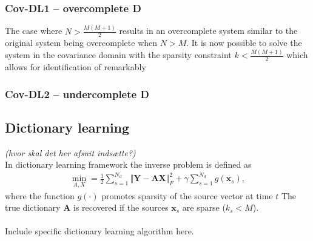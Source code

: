 \subsubsection*{Cov-DL1 -- overcomplete \textbf{D}}
The case where $N > \frac{M(M+1)}{2}$ results in an overcomplete system similar to the original system being overcomplete when $N>M$. It is now possible to solve the system in the covariance domain with the sparsity constraint $k < \frac{M(M+1)}{2}$ which allows for identification of remarkably     







  

\subsubsection*{Cov-DL2 -- undercomplete \textbf{D}}


\subsection{Dictionary learning}
\textit{(hvor skal det her afsnit indsætte?)}\\ 
In dictionary learning framework the inverse problem is defined as
\begin{align*}
\min_{A,X} = \frac{1}{2} \sum_{s=1}^{N_d} \Vert \mathbf{Y} - \mathbf{AX} \Vert_F^2 + \gamma \sum_{s=1}^{N_d} g(\mathbf{x}_s),
\end{align*}
where the function $g(\cdot)$ promotes sparsity of the source vector at time $t$ 
The true dictionary $\mathbf{A}$ is recovered if the sources $\mathbf{x}_s$ are sparse ($k_s < M$).
\\  \\
Include specific dictionary learning algorithm here.


